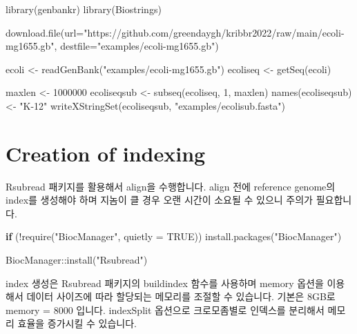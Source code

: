 \documentclass[
]{book}
\newenvironment{Shaded}{\begin{snugshade}}{\end{snugshade}}
\newcommand{\AttributeTok}[1]{\textcolor[rgb]{0.77,0.63,0.00}{#1}}
\newcommand{\ConstantTok}[1]{\textcolor[rgb]{0.00,0.00,0.00}{#1}}
\newcommand{\ControlFlowTok}[1]{\textcolor[rgb]{0.13,0.29,0.53}{\textbf{#1}}}
\newcommand{\DecValTok}[1]{\textcolor[rgb]{0.00,0.00,0.81}{#1}}
\newcommand{\FunctionTok}[1]{\textcolor[rgb]{0.00,0.00,0.00}{#1}}
\newcommand{\NormalTok}[1]{#1}
\newcommand{\OtherTok}[1]{\textcolor[rgb]{0.56,0.35,0.01}{#1}}
\newcommand{\SpecialCharTok}[1]{\textcolor[rgb]{0.00,0.00,0.00}{#1}}
\newcommand{\StringTok}[1]{\textcolor[rgb]{0.31,0.60,0.02}{#1}}
\begin{document}
\begin{Shaded}
\begin{Highlighting}[]
\FunctionTok{library}\NormalTok{(genbankr)}
\FunctionTok{library}\NormalTok{(Biostrings)}

\FunctionTok{download.file}\NormalTok{(}\AttributeTok{url=}\StringTok{"https://github.com/greendaygh/kribbr2022/raw/main/ecoli{-}mg1655.gb"}\NormalTok{, }\AttributeTok{destfile=}\StringTok{"examples/ecoli{-}mg1655.gb"}\NormalTok{)}

\NormalTok{ecoli }\OtherTok{\textless{}{-}} \FunctionTok{readGenBank}\NormalTok{(}\StringTok{"examples/ecoli{-}mg1655.gb"}\NormalTok{)}
\NormalTok{ecoliseq }\OtherTok{\textless{}{-}} \FunctionTok{getSeq}\NormalTok{(ecoli)}


\NormalTok{maxlen }\OtherTok{\textless{}{-}} \DecValTok{1000000}
\NormalTok{ecoliseqsub }\OtherTok{\textless{}{-}} \FunctionTok{subseq}\NormalTok{(ecoliseq, }\DecValTok{1}\NormalTok{, maxlen)}
\FunctionTok{names}\NormalTok{(ecoliseqsub) }\OtherTok{\textless{}{-}} \StringTok{"K{-}12"}
\FunctionTok{writeXStringSet}\NormalTok{(ecoliseqsub, }\StringTok{"examples/ecolisub.fasta"}\NormalTok{)}
\end{Highlighting}
\end{Shaded}

\hypertarget{creation-of-indexing}{%
\section{Creation of indexing}\label{creation-of-indexing}}

Rsubread 패키지를 활용해서 align을 수행합니다. align 전에 reference genome의 index를 생성해야 하며 지놈이 클 경우 오랜 시간이 소요될 수 있으니 주의가 필요합니다.

\begin{Shaded}
\begin{Highlighting}[]
\ControlFlowTok{if}\NormalTok{ (}\SpecialCharTok{!}\FunctionTok{require}\NormalTok{(}\StringTok{"BiocManager"}\NormalTok{, }\AttributeTok{quietly =} \ConstantTok{TRUE}\NormalTok{))}
    \FunctionTok{install.packages}\NormalTok{(}\StringTok{"BiocManager"}\NormalTok{)}

\NormalTok{BiocManager}\SpecialCharTok{::}\FunctionTok{install}\NormalTok{(}\StringTok{"Rsubread"}\NormalTok{)}
\end{Highlighting}
\end{Shaded}

index 생성은 Rsubread 패키지의 buildindex 함수를 사용하며 memory 옵션을 이용해서 데이터 사이즈에 따라 할당되는 메모리를 조절할 수 있습니다. 기본은 8GB로 memory = 8000 입니다. indexSplit 옵션으로 크로모좀별로 인덱스를 분리해서 메모리 효율을 증가시킬 수 있습니다.
\end{document}
